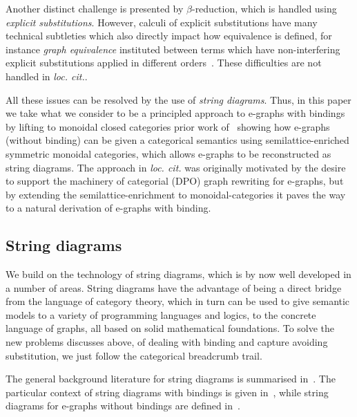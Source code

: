 \documentclass[]{IEEEtran}
\begin{document}
Another distinct challenge is presented by $\beta$-reduction, which is handled using \emph{explicit substitutions}. 
However, calculi of explicit substitutions have many technical subtleties which also directly impact how equivalence is defined, for instance \emph{graph equivalence} instituted between terms which have non-interfering explicit substitutions applied in different orders~\cite{accattoli2014nonstandard}. 
These difficulties are not handled in \emph{loc. cit.}.

All these issues can be resolved by the use of \emph{string diagrams}.
Thus, in this paper we take what we consider to be a principled approach to e-graphs with bindings by lifting to monoidal closed categories prior work of~\cite{ghica2024equivalencehypergraphsegraphsmonoidal} showing how e-graphs (without binding) can be given a categorical semantics using semilattice-enriched symmetric monoidal categories, which allows e-graphs to be reconstructed as string diagrams.
The approach in \emph{loc. cit.} was originally motivated by the desire to support the machinery of categorial (DPO) graph rewriting for e-graphs, but by extending the semilattice-enrichment to monoidal-categories it paves the way to a natural derivation of e-graphs with binding.

\subsection{String diagrams}

We build on the technology of string diagrams, which is by now well developed in a number of areas. 
String diagrams have the advantage of being a direct bridge from the language of category theory, which in turn can be used to give semantic models to a variety of programming languages and logics, to the concrete language of graphs, all based on solid mathematical foundations. 
To solve the new problems discusses above, of dealing with binding and capture avoiding substitution, we just follow the categorical breadcrumb trail.

The general background literature for string diagrams is summarised in~\cite{piedeleu2023introductionstringdiagramscomputer}.
The particular context of string diagrams with bindings is given in~\cite{ghica2024stringdiagramslambdacalculifunctional}, while string diagrams for e-graphs without bindings are defined in~\cite{ghica2024equivalencehypergraphsegraphsmonoidal}.
\end{document}

